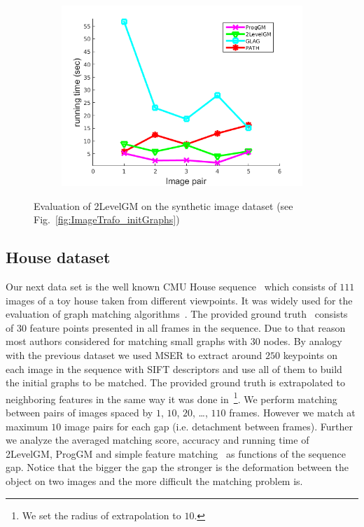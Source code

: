 \begin{figure}[h]
\begin{subfigure}[b]{0.32\textwidth}
			\includegraphics[scale=0.25]{"chapter3/fig/ImageTrafo/anchor_descr/using_cpd_afftrafo/performance/time1"}
		\end{subfigure} 	
	\caption[Evaluation of 2LevelGM on the synthetic image dataset (see Fig.~\ref{fig:ImageTrafo_initGraphs})]{Evaluation of 2LevelGM on the synthetic image dataset (see Fig.~\ref{fig:ImageTrafo_initGraphs})}
	 \label{fig:ImageTrafo}
\end{figure}

\subsection{House dataset}
Our next data set is the well known CMU House sequence~\cite{CMUHouse} which consists of $111$ images of a toy house taken from different viewpoints. It was widely used for the evaluation of graph matching algorithms~\cite{Armiti2014,Hancock_ModalClusters,Cho2010_RRWM,Duchenne2011,FastPFP,Hancock_EM_SVD}. The provided ground truth~\cite{CMUHouse_GT} consists of $30$ feature points presented in all frames in the sequence. Due to that reason most authors considered for matching small graphs with $30$ nodes. By analogy with the previous dataset we used MSER to extract around $250$ keypoints on each image in the sequence with SIFT descriptors and use all of them to build the initial graphs to be matched. The provided ground truth is extrapolated to neighboring features in the same way it was done in~\cite{Cho2012_ProgressiveGM}\footnote{We set the radius of extrapolation to $10$.}. We perform matching between pairs of images spaced by $1$, $10$, $20$, \dots, $110$ frames. However we match at maximum $10$ image pairs for each gap (i.e. detachment between frames). Further we  analyze the averaged matching score, accuracy and running time of 2LevelGM, ProgGM and simple feature matching~\cite{Lowe2004} as functions of the sequence gap. Notice that the bigger the gap the stronger is the deformation between the object on two images and the more difficult the matching problem is. 

